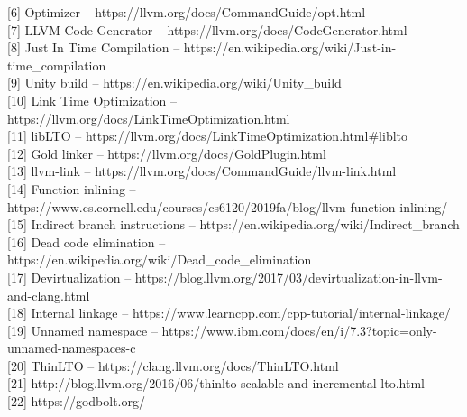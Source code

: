\documentclass[12pt,oneside]{memoir}
\begin{document}
[6] Optimizer -- https://llvm.org/docs/CommandGuide/opt.html \\

[7] LLVM Code Generator -- https://llvm.org/docs/CodeGenerator.html \\

[8] Just In Time Compilation  -- https://en.wikipedia.org/wiki/Just-in-time{\_}compilation \\

[9] Unity build -- https://en.wikipedia.org/wiki/Unity{\_}build \\ 

[10] Link Time Optimization -- https://llvm.org/docs/LinkTimeOptimization.html \\

[11] libLTO -- https://llvm.org/docs/LinkTimeOptimization.html{\#}liblto \\

[12] Gold linker -- https://llvm.org/docs/GoldPlugin.html \\

[13] llvm-link -- https://llvm.org/docs/CommandGuide/llvm-link.html \\

[14] Function inlining -- https://www.cs.cornell.edu/courses/cs6120/2019fa/blog/llvm-function-inlining/ \\

[15] Indirect branch instructions -- https://en.wikipedia.org/wiki/Indirect{\_}branch \\

[16] Dead code elimination -- https://en.wikipedia.org/wiki/Dead{\_}code{\_}elimination \\

[17] Devirtualization -- https://blog.llvm.org/2017/03/devirtualization-in-llvm-and-clang.html \\

[18] Internal linkage -- https://www.learncpp.com/cpp-tutorial/internal-linkage/ \\

[19] Unnamed namespace -- https://www.ibm.com/docs/en/i/7.3?topic=only-unnamed-namespaces-c \\

[20] ThinLTO -- https://clang.llvm.org/docs/ThinLTO.html \\

[21] http://blog.llvm.org/2016/06/thinlto-scalable-and-incremental-lto.html \\

[22] https://godbolt.org/ \\
\end{document}
